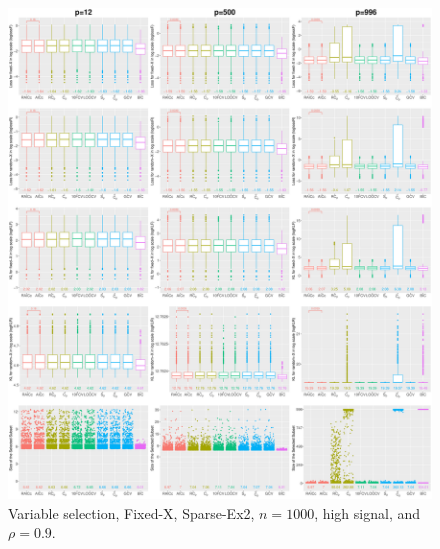 \begin{figure}[!ht]
\centering
\includegraphics[width=\textwidth]{figures/supplement/fixedx/subset_selection/Sparse-Ex2_n1000_hsnr_rho09.eps}
\caption{Variable selection, Fixed-X, Sparse-Ex2, $n=1000$, high signal, and $\rho=0.9$.}
\end{figure}
\clearpage
